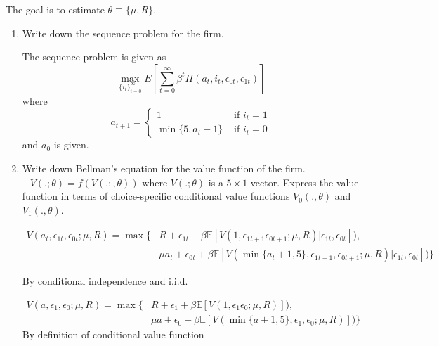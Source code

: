 \documentclass{article}
\newcommand{\epszero}{\epsilon_{0t}}
\newcommand{\epsone}{\epsilon_{1t}}
\begin{document}
The goal is to estimate $\theta \equiv \{\mu, R\}$. 

\begin{enumerate}
\item Write down the sequence problem for the firm.

\begin{answer}

The sequence problem is given as 
\[
\max_{\{i_t\}_{t=0}^\infty} E\left[
\sum_{t=0}^\infty \beta^t \Pi(a_t, i_t, \epszero, \epsone)
\right]
\]
where 
\[
a_{t+1} = \begin{cases}
    1 & \text{ if $i_t = 1$} \\ 
    \min\{5, a_t + 1\} & \text{ if $i_t = 0$} 
\end{cases}
\]
and $a_0$ is given. 



\end{answer}

\item Write down Bellman’s equation for the value function of the firm. $- V(.;\theta) = f(V(.;, \theta))$ where $V(.;\theta)$ is a $5 \times 1$ vector. Express the value function in terms of choice-specific conditional value functions $\bar{V}_0(., \theta)$ and $\bar{V}_1(., \theta)$.

\begin{answer}
\begin{align*}
V(a_t,\epsilon_{1t},\epsilon_{0t}; \mu, R)  =   \max \{  & R+\epsilon_{1t} + \beta \mathbb{E}[V(1,\epsilon_{1t+1}\epsilon_{0t+1}; \mu,R)|\epsilon_{1t},\epsilon_{0t}]) , \\ & \mu a_t +\epsilon_{0t} + \beta \mathbb{E}[V(\min\{a_t+1, 5\},\epsilon_{1t+1}, \epsilon_{0t+1}; \mu,R)|\epsilon_{1t},\epsilon_{0t}])\} 
\end{align*}

By conditional independence  and i.i.d.

\begin{align*}
V(a,\epsilon_{1},\epsilon_{0}; \mu, R)  =   \max \{  & R+\epsilon_{1} + \beta \mathbb{E}[V(1,\epsilon_{1}\epsilon_{0}; \mu,R)]) , \\ & \mu a +\epsilon_{0} + \beta \mathbb{E}[V(\min\{a+1, 5\},\epsilon_{1}, \epsilon_{0}; \mu,R)])\} 
\end{align*}
By definition of conditional value function 



\end{answer}
\end{enumerate}
\end{document}
